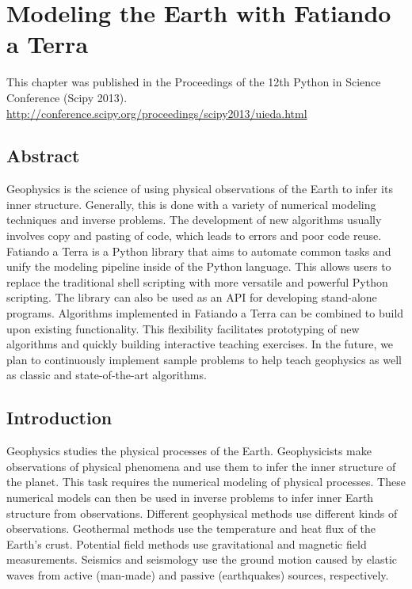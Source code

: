 \chapter{Modeling the Earth with Fatiando a Terra}
\label{chap:fatiando}

This chapter was published in the Proceedings of the 12th Python in Science
Conference (Scipy 2013).
\url{http://conference.scipy.org/proceedings/scipy2013/uieda.html}

\section{Abstract}

Geophysics is the science of using physical observations of the Earth to infer
its inner structure. Generally, this is done with a variety of numerical
modeling techniques and inverse problems. The development of new algorithms
usually involves copy and pasting of code, which leads to errors and poor code
reuse. Fatiando a Terra is a Python library that aims to automate common tasks
and unify the modeling pipeline inside of the Python language. This allows
users to replace the traditional shell scripting with more versatile and
powerful Python scripting. The library can also be used as an API for
developing stand-alone programs.  Algorithms implemented in Fatiando a Terra
can be combined to build upon existing functionality. This flexibility
facilitates prototyping of new algorithms and quickly building interactive
teaching exercises. In the future, we plan to continuously implement sample
problems to help teach geophysics as well as classic and state-of-the-art
algorithms.




\section{Introduction}

Geophysics studies the physical processes of the Earth. Geophysicists make
observations of physical phenomena and use them to infer the inner structure of
the planet. This task requires the numerical modeling of physical processes.
These numerical models can then be used in inverse problems to infer inner
Earth structure from observations. Different geophysical methods use different
kinds of observations. Geothermal methods use the temperature and heat flux of
the Earth's crust.  Potential field methods use gravitational and magnetic
field measurements. Seismics and seismology use the ground motion caused by
elastic waves from active (man-made) and passive (earthquakes) sources,
respectively.

